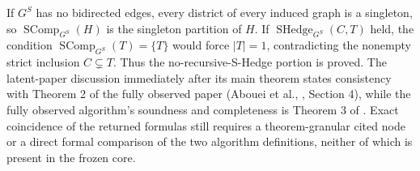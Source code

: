 If \(G^S\) has no bidirected edges, every district of every induced graph is a singleton, so \(\operatorname{SComp}_{G^S}(H)\) is the singleton partition of \(H\).  If \(\operatorname{SHedge}_{G^S}(C,T)\) held, the condition \(\operatorname{SComp}_{G^S}(T)=\{T\}\) would force \(|T|=1\), contradicting the nonempty strict inclusion \(C\subsetneq T\).  Thus the no-recursive-S-Hedge portion is proved.  The latent-paper discussion immediately after its main theorem states consistency with Theorem 2 of the fully observed paper (Abouei et al., \cite{AboueiEtAl2024LatentSID}, Section 4), while the fully observed algorithm's soundness and completeness is Theorem 3 of \cite{AboueiEtAl2024SID}.  Exact coincidence of the returned formulas still requires a theorem-granular cited node or a direct formal comparison of the two algorithm definitions, neither of which is present in the frozen core.